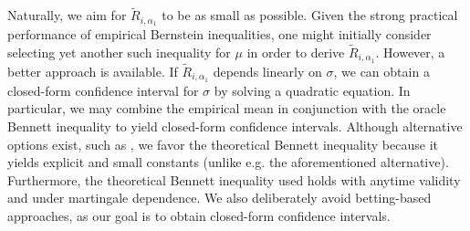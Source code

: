 Naturally, we aim for $\tilde R_{i,\alpha_1}$ to be as small as possible. Given the strong practical performance of empirical Bernstein inequalities, one might initially consider selecting yet another such inequality for $\mu$ in order to derive $\tilde R_{i,\alpha_1}$. However, a better approach is available. If $\tilde R_{i,\alpha_1}$ depends linearly on $\sigma$, we can obtain a closed-form confidence interval for $\sigma$ by solving a quadratic equation. In particular, we may combine the empirical mean in conjunction with the oracle Bennett inequality to yield closed-form confidence intervals. Although alternative options exist, such as \citet[Theorem~1]{lee2022optimal}, we favor the theoretical Bennett inequality because it yields explicit and small constants (unlike e.g. the aforementioned alternative). Furthermore, the theoretical Bennett inequality used holds with anytime validity and under martingale dependence. We also deliberately avoid betting-based approaches, as our goal is to obtain closed-form confidence intervals. 




